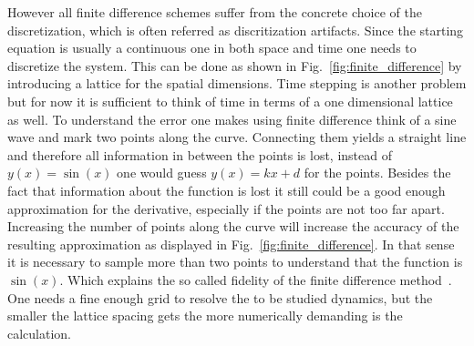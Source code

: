 However all finite difference schemes suffer from the concrete choice of the discretization, which is often referred as discritization artifacts.
Since the starting equation is usually a continuous one in both space and time one needs to discretize the system. 
This can be done as shown in Fig.~\ref{fig:finite_difference} by introducing a lattice for the spatial dimensions. 
Time stepping is another problem but for now it is sufficient to think of time in terms of a one dimensional lattice as well. 
To understand the error one makes using finite difference think of a sine wave and mark two points along the curve.
Connecting them yields a straight line and therefore all information in between the points is lost, instead of $y(x) = \sin(x)$ one would guess $y(x) = kx + d$ for the points.
Besides the fact that information about the function is lost it still could be a good enough approximation for the derivative, especially if the points are not too far apart.
Increasing the number of points along the curve will increase the accuracy of the resulting approximation as displayed in Fig.~\ref{fig:finite_difference}.
In that sense it is necessary to sample more than two points to understand that the function is $\sin(x)$.
Which explains the so called fidelity of the finite difference method~\cite{GURUSWAMY200231}.
One needs a fine enough grid to resolve the to be studied dynamics, but the smaller the lattice spacing gets the more numerically demanding is the calculation.


